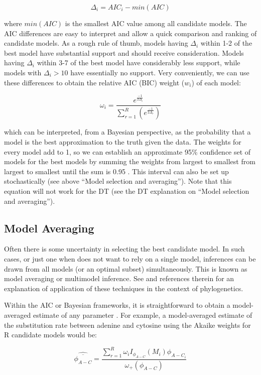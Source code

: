 \[
\Delta_i = AIC_i - min(AIC)
\]

where $min(AIC)$ is the smallest AIC value among all candidate models. The AIC differences are easy to interpret and allow a quick comparison and ranking of candidate models. As a rough rule of thumb, models having $\Delta_i$ within 1-2 of the best model have substantial support and should receive consideration. Models having $\Delta_i$ within 3-7 of the best model have considerably less support, while models with $\Delta_i > 10$ have essentially no support. Very conveniently, we can use these differences to obtain the relative AIC (BIC) weight ($w_i$) of each model:

\[
\omega_i = \frac{e^{\frac{-1}{2 \Delta_i}}}{\sum_{r=1}^R(e^\frac{-1}{2 \Delta_r})}
\]

which can be interpreted, from a Bayesian perspective, as the probability that a model is the best approximation to the truth given the data. The weights for every model add to 1, so we can establish an approximate 95\% confidence set of models for the best models by summing the weights from largest to smallest from largest to smallest until the sum is 0.95 \citep{Burnham-1998, Burnham-2003}. This interval can also be set up stochastically (see above ``Model selection and averaging''). Note that this equation will not work for the DT (see the DT explanation on ``Model selection and averaging'').

\subsection{Model Averaging}
\label{sec:model-averaging}

Often there is some uncertainty in selecting the best candidate model. In such cases, or just one when does not want to rely on a single model, inferences can be drawn from all models (or an optimal subset) simultaneously. This is known as model averaging or multimodel inference. See \citet{Posada-2004} and references therein for an explanation of application of these techniques in the context of phylogenetics.

Within the AIC or Bayesian frameworks, it is straightforward to obtain a model-averaged estimate of any parameter \citep{Madigan-1994, Raftery-1996, Hoeting-1999, Wasserman-2000, Burnham-2003, Posada-2003}. For example, a model-averaged estimate of the substitution rate between adenine and cytosine using the Akaike weights for R candidate models would be:

\[
\widehat{\overline{\phi_{A-C}}} = \frac{\sum_{r=1}^R \omega_i I_{\phi_{A-C}}(M_i) \phi_{A-C_i}}{\omega_+(\phi_{A-C})}
\]

